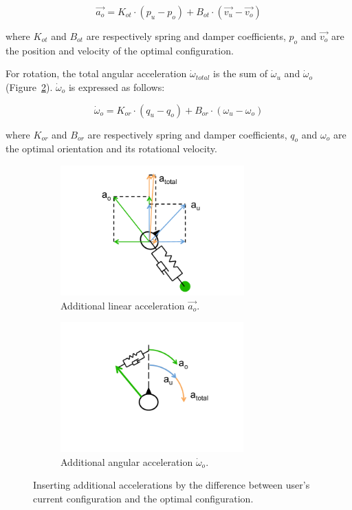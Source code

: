 \begin{equation}
\overrightarrow{a_{o}}=K_{ot} \cdot (p_{u}-p_{o})+ B_{ot} \cdot (\overrightarrow{v_{u}}-\overrightarrow{v_{o}})
\end{equation}

where $K_{ot}$ and $B_{ot}$ are respectively spring and damper coefficients, $p_{o}$ and $\overrightarrow{v_{o}}$ are the position and velocity of the optimal configuration.

For rotation, the total angular acceleration $\dot{\omega}_{total}$ is the sum of $\dot{\omega}_{u}$ and $\dot{\omega}_{o}$ (Figure~\ref{fig:5_option2:r}). $\dot{\omega}_{o}$ is expressed as follows:

\begin{equation}
\dot{\omega}_{o}=K_{or} \cdot (q_{u}-q_{o})+ B_{or} \cdot (\omega_{u}-\omega_{o})
\end{equation}

where $K_{or}$ and $B_{or}$ are respectively spring and damper coefficients, $q_{o}$ and $\omega_{o}$ are the optimal orientation and its rotational velocity.

\begin{figure}[htb]
  \begin{subfigure}{.5\textwidth}
    \centering
    \includegraphics[height=5cm]{figures/ch5/option2_t}
    \caption{Additional linear acceleration $\overrightarrow{a_{o}}$.}
    \label{fig:5_option2:t}
  \end{subfigure}
  \begin{subfigure}{.5\textwidth}
    \centering
    \includegraphics[height=5cm]{figures/ch5/option2_r}
    \caption{Additional angular acceleration $\dot{\omega}_{o}$.}
    \label{fig:5_option2:r}
  \end{subfigure}
  \caption{\label{fig:5_option2}Inserting additional accelerations by the difference between user's current configuration and the optimal configuration.}
\end{figure}

